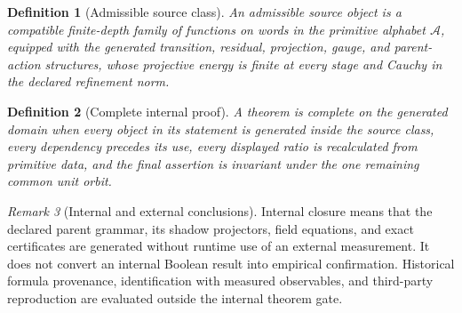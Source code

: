 \documentclass[11pt]{article}
\numberwithin{equation}{section}
\newtheorem{definition}{Definition}[section]
\theoremstyle{remark}
\newtheorem{remark}[definition]{Remark}
\begin{document}
\begin{definition}[Admissible source class]
An admissible source object is a compatible finite-depth family of functions on words in the primitive alphabet $\mathcal A$, equipped with the generated transition, residual, projection, gauge, and parent-action structures, whose projective energy is finite at every stage and Cauchy in the declared refinement norm.
\end{definition}

\begin{definition}[Complete internal proof]
A theorem is complete on the generated domain when every object in its statement is generated inside the source class, every dependency precedes its use, every displayed ratio is recalculated from primitive data, and the final assertion is invariant under the one remaining common unit orbit.
\end{definition}

\begin{remark}[Internal and external conclusions]
Internal closure means that the declared parent grammar, its shadow projectors, field equations, and exact certificates are generated without runtime use of an external measurement. It does not convert an internal Boolean result into empirical confirmation. Historical formula provenance, identification with measured observables, and third-party reproduction are evaluated outside the internal theorem gate.
\end{remark}
\end{document}
